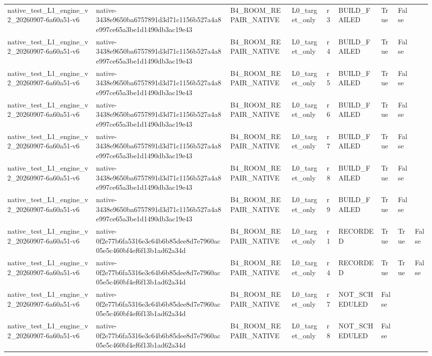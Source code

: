 \begin{tabular}{lllllllll}
native\_test\_L1\_engine\_v2\_20260907-6a60a51-v6 & native-3438e9650ba6757891d3d71c1156b527a4a8e997ce65a3be1d1490db3ac19e43 & B4\_ROOM\_REPAIR\_NATIVE & L0\_target\_only & r3 & BUILD\_FAILED & True & False &  \\
native\_test\_L1\_engine\_v2\_20260907-6a60a51-v6 & native-3438e9650ba6757891d3d71c1156b527a4a8e997ce65a3be1d1490db3ac19e43 & B4\_ROOM\_REPAIR\_NATIVE & L0\_target\_only & r4 & BUILD\_FAILED & True & False &  \\
native\_test\_L1\_engine\_v2\_20260907-6a60a51-v6 & native-3438e9650ba6757891d3d71c1156b527a4a8e997ce65a3be1d1490db3ac19e43 & B4\_ROOM\_REPAIR\_NATIVE & L0\_target\_only & r5 & BUILD\_FAILED & True & False &  \\
native\_test\_L1\_engine\_v2\_20260907-6a60a51-v6 & native-3438e9650ba6757891d3d71c1156b527a4a8e997ce65a3be1d1490db3ac19e43 & B4\_ROOM\_REPAIR\_NATIVE & L0\_target\_only & r6 & BUILD\_FAILED & True & False &  \\
native\_test\_L1\_engine\_v2\_20260907-6a60a51-v6 & native-3438e9650ba6757891d3d71c1156b527a4a8e997ce65a3be1d1490db3ac19e43 & B4\_ROOM\_REPAIR\_NATIVE & L0\_target\_only & r7 & BUILD\_FAILED & True & False &  \\
native\_test\_L1\_engine\_v2\_20260907-6a60a51-v6 & native-3438e9650ba6757891d3d71c1156b527a4a8e997ce65a3be1d1490db3ac19e43 & B4\_ROOM\_REPAIR\_NATIVE & L0\_target\_only & r8 & BUILD\_FAILED & True & False &  \\
native\_test\_L1\_engine\_v2\_20260907-6a60a51-v6 & native-3438e9650ba6757891d3d71c1156b527a4a8e997ce65a3be1d1490db3ac19e43 & B4\_ROOM\_REPAIR\_NATIVE & L0\_target\_only & r9 & BUILD\_FAILED & True & False &  \\
native\_test\_L1\_engine\_v2\_20260907-6a60a51-v6 & native-0f2e77b6fa5316e3c64b6b85dee8d7e7960ac05e5c460bf4ef6f13b1ad62a34d & B4\_ROOM\_REPAIR\_NATIVE & L0\_target\_only & r1 & RECORDED & True & True & False \\
native\_test\_L1\_engine\_v2\_20260907-6a60a51-v6 & native-0f2e77b6fa5316e3c64b6b85dee8d7e7960ac05e5c460bf4ef6f13b1ad62a34d & B4\_ROOM\_REPAIR\_NATIVE & L0\_target\_only & r4 & RECORDED & True & True & False \\
native\_test\_L1\_engine\_v2\_20260907-6a60a51-v6 & native-0f2e77b6fa5316e3c64b6b85dee8d7e7960ac05e5c460bf4ef6f13b1ad62a34d & B4\_ROOM\_REPAIR\_NATIVE & L0\_target\_only & r7 & NOT\_SCHEDULED & False &  &  \\
native\_test\_L1\_engine\_v2\_20260907-6a60a51-v6 & native-0f2e77b6fa5316e3c64b6b85dee8d7e7960ac05e5c460bf4ef6f13b1ad62a34d & B4\_ROOM\_REPAIR\_NATIVE & L0\_target\_only & r8 & NOT\_SCHEDULED & False &  &  \\

\end{tabular}
